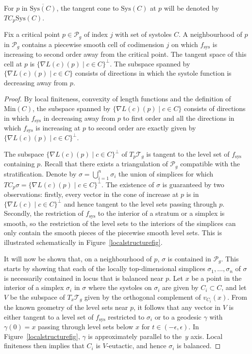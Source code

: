 For $p$ in $\overline{\mathrm{Sys}(C)}$, the tangent cone to $\mathrm{Sys}(C)$ at $p$ will be denoted by $TC_{p}\mathrm{Sys}(C)$.

\begin{Proposition}
\label{localstructure}
Fix a critical point $p\in \mathcal{P}_{g}$ of index $j$ with set of systoles $C$. A neighbourhood of $p$ in $\mathcal{P}_{g}$ contains a piecewise smooth cell of codimension $j$ on which $f_{\mathrm{sys}}$ is increasing to second order away from the critical point. The tangent space of this cell at $p$ is $\{\nabla L(c)(p) \mid c\in C\}^{\perp}$. The subspace spanned by $\{\nabla L(c)(p) \mid c\in C\}$ consists of directions in which the systole function is decreasing away from $p$.
\end{Proposition}

\begin{proof}
By local finiteness, convexity of length functions and the definition of $\mathrm{Min}(C)$, the subspace spanned by $\{\nabla L(c)(p) \mid c\in C\}$ consists of directions in which $f_{\mathrm{sys}}$ in decreasing away from $p$ to first order and all the directions in which $f_{\mathrm{sys}}$ is increasing at $p$ to second order are exactly given by $\{\nabla L(c)(p) \mid c\in C\}^{\perp}$.

The subspace $\{\nabla L(c)(p) \mid c\in C\}^{\perp}$ of $T_{p}\mathcal{T}_{g}$ is tangent to the level set of $f_{\mathrm{sys}}$ containing $p$. Recall that there exists a triangulation of $\mathcal{P}_{g}$ compatible with the stratification. Denote by $\sigma=\bigcup_{i=1}^{n}\sigma_{i}$ the union of simplices for which $TC_{p}\sigma=\{\nabla L(c)(p) \mid c\in C\}^{\perp}$. The existence of $\sigma$ is guaranteed by two observations: firstly, every vector in the cone of increase at $p$ is in $\{\nabla L(c) \mid c\in C\}^{\perp}$ and hence tangent to the level sets passing through $p$. Secondly, the restriction of $f_{\mathrm{sys}}$ to the interior of a stratum or a simplex is smooth, so the restriction of the level sets to the interiors of the simplices can only contain the smooth pieces of the piecewise smooth level sets. This is illustrated schematically in Figure~\ref{localstructurefig}.

It will now be shown that, on a neighbourhood of $p$, $\sigma$ is contained in $\mathcal{P}_{g}$. This starts by showing that each of the locally top-dimensional simplices $\sigma_{1}, \dots, \sigma_{n}$ of $\sigma$ is necessarily contained in locus that is balanced near $p$. Let $x$ be a point in the interior of a simplex $\sigma_{i}$ in $\sigma$ where the systoles on $\sigma_{i}$ are given by $C_{i}\subset C$, and let $V$ be the subspace of $T_{x}\mathcal{T}_{g}$ given by the orthogonal complement of $v_{C_{i}}(x)$. From the known geometry of the level sets near $p$, it follows that any vector in $V$ is either tangent to a level set of $f_{\mathrm{sys}}$ restricted to $\sigma_{i}$ or to a geodesic $\gamma$ with $\gamma(0)=x$ passing through level sets below $x$ for $t\in (-\epsilon,\epsilon)$. In Figure~\ref{localstructurefig}, $\gamma$ is approximately parallel to the~$y$ axis. Local finiteness then implies that $C_{i}$ is $V$-eutactic, and hence $\sigma_{i}$ is balanced.


\end{proof}

